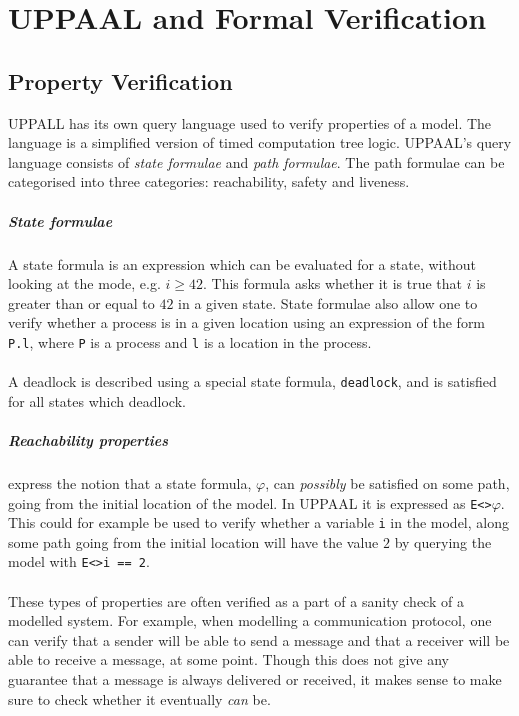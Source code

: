 \chapter{UPPAAL and Formal Verification}
\section{Property Verification}
UPPALL has its own query language used to verify properties of a model\cite[p. 7]{upptut}. The language is a simplified version of timed computation tree logic. UPPAAL's query language consists of \textit{state formulae} and \textit{path formulae}. The path formulae can be categorised into three categories: reachability, safety and liveness.
\paragraph{State formulae}
A state formula is an expression which can be evaluated for a state, without looking at the mode, e.g. $i \geq 42$. This formula asks whether it is true that $i$ is greater than or equal to $42$ in a given state. State formulae also allow one to verify whether a process is in a given location using an expression of the form \texttt{P.l}, where \texttt{P} is a process and \texttt{l} is a location in the process.\\\\
A deadlock is described using a special state formula, \texttt{deadlock}, and is satisfied for all states which deadlock.
\paragraph{Reachability properties} express the notion that a state formula, $\varphi$, can \textit{possibly} be satisfied on some path, going from the initial location of the model. In UPPAAL it is expressed as \texttt{E<>$\varphi$}. This could for example be used to verify whether a variable \texttt{i} in the model, along some path going from the initial location will have the value $2$ by querying the model with \texttt{E<>i == 2}.\\\\
These types of properties are often verified as a part of a sanity check of a modelled system\cite[p. 8]{upptut}. For example, when modelling a communication protocol, one can verify that a sender will be able to send a message and that a receiver will be able to receive a message, at some point. Though this does not give any guarantee that a message is always delivered or received, it makes sense to make sure to check whether it eventually \textit{can} be.
